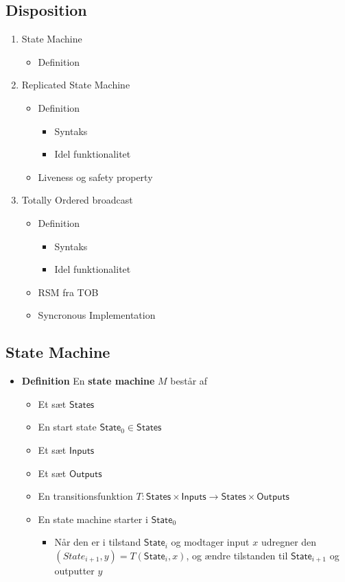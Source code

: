 \documentclass[a4, english]{article}
\begin{document}
\subsection{Disposition}
\begin{enumerate}
	\item State Machine
  \begin{itemize}
  	\item Definition
  \end{itemize}
	\item Replicated State Machine 
  \begin{itemize}
  	\item Definition
    \begin{itemize}
    	\item Syntaks
      \item Idel funktionalitet
    \end{itemize}  
    \item Liveness og safety property
  \end{itemize}
	\item Totally Ordered broadcast 
  \begin{itemize}
  	\item Definition
    \begin{itemize}
    	\item Syntaks
      \item Idel funktionalitet
    \end{itemize}  
    \item RSM fra TOB
    \item Syncronous Implementation
  \end{itemize}
\end{enumerate}
\newpage

\subsection{State Machine}
\begin{itemize}
	\item \textbf{Definition} En \textbf{state machine} $M$ består af  
  \begin{itemize}
  	\item Et sæt $\mathsf{States}$
    \item En start state $\mathsf{State}_0 \in \mathsf{States}$
  	\item Et sæt $\mathsf{Inputs}$
  	\item Et sæt $\mathsf{Outputs}$
  	\item En transitionsfunktion $T: \mathsf{States} \times \mathsf{Inputs} \to \mathsf{States} \times \mathsf{Outputs}$ 
    \item En state machine starter i $\mathsf{State}_0$
    \begin{itemize}
	    \item Når den er i tilstand $\mathsf{State}_i$ og modtager input $x$ udregner den $(State_{i+1},y)=T(\mathsf{State}_i,x)$, og ændre tilstanden til $\mathsf{State}_{i+1}$ og outputter $y$ 
    \end{itemize} 
  \end{itemize}
\end{itemize}
\end{document}
